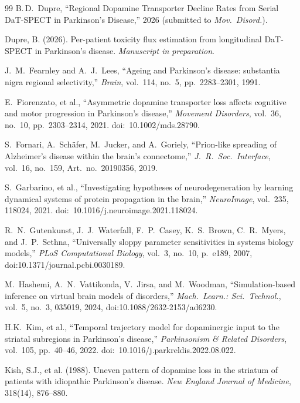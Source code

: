 \begin{thebibliography}{99}
 B.\,D.~Dupre, ``Regional Dopamine Transporter Decline Rates from Serial DaT-SPECT in Parkinson's Disease,'' 2026 (submitted to \textit{Mov.\ Disord.}).

Dupre, B. (2026).
\newblock Per-patient toxicity flux estimation from longitudinal DaT-SPECT in Parkinson's disease.
\newblock \emph{Manuscript in preparation}.

J.~M.~Fearnley and A.~J.~Lees, ``Ageing and Parkinson's disease: substantia nigra regional selectivity,'' \textit{Brain}, vol.~114, no.~5, pp.~2283--2301, 1991.

E.~Fiorenzato, et al., ``Asymmetric dopamine transporter loss affects cognitive and motor progression in Parkinson's disease,'' \textit{Movement Disorders}, vol.~36, no.~10, pp.~2303--2314, 2021. doi:~10.1002/mds.28790.

S.~Fornari, A.~Sch{\"a}fer, M.~Jucker, and A.~Goriely, ``Prion-like spreading of Alzheimer's disease within the brain's connectome,'' \textit{J.\ R.\ Soc.\ Interface}, vol.~16, no.~159, Art.\ no.~20190356, 2019.


S.~Garbarino, et al., ``Investigating hypotheses of neurodegeneration by learning dynamical systems of protein propagation in the brain,'' \textit{NeuroImage}, vol.~235, 118024, 2021. doi:~10.1016/j.neuroimage.2021.118024.

R.~N.~Gutenkunst, J.~J.~Waterfall, F.~P.~Casey, K.~S.~Brown, C.~R.~Myers, and J.~P.~Sethna, ``Universally sloppy parameter sensitivities in systems biology models,'' \textit{PLoS Computational Biology}, vol.~3, no.~10, p.~e189, 2007, doi:10.1371/journal.pcbi.0030189.


M.~Hashemi, A.~N.~Vattikonda, V.~Jirsa, and M.~Woodman, ``Simulation-based inference on virtual brain models of disorders,'' \textit{Mach.\ Learn.: Sci.\ Technol.}, vol.~5, no.~3, 035019, 2024, doi:10.1088/2632-2153/ad6230.

H.K.~Kim, et al., ``Temporal trajectory model for dopaminergic input to the striatal subregions in Parkinson's disease,'' \textit{Parkinsonism \& Related Disorders}, vol.~105, pp.~40--46, 2022. doi:~10.1016/j.parkreldis.2022.08.022.

Kish, S.J., et al. (1988).
\newblock Uneven pattern of dopamine loss in the striatum of patients with idiopathic Parkinson's disease.
\newblock \emph{New England Journal of Medicine}, 318(14), 876--880.


\end{thebibliography}
